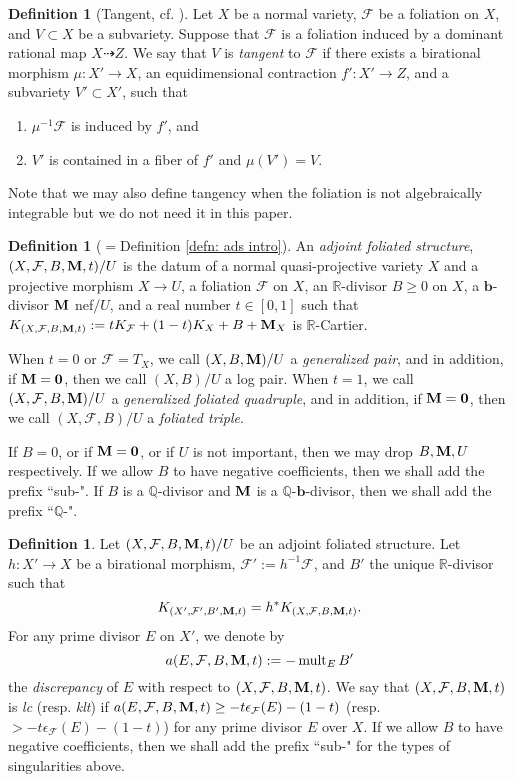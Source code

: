 \documentclass[12pt]{amsart}
\numberwithin{equation}{section}
\newcommand{\bb}{\bm{b}}
\newcommand{\Mm}{{\bf{M}}}
\newcommand{\Qq}{\mathbb{Q}}
\newcommand{\Rr}{\mathbb{R}}
\newcommand{\mult}{\operatorname{mult}}
\newcommand{\Ff}{\mathcal{F}}
\theoremstyle{definition}
\newtheorem{defn}[thm]{Definition}
\theoremstyle{definition}
\theoremstyle{definition}
\begin{document}
\begin{defn}[Tangent, {cf. \cite[Section 3.4]{ACSS21}}]\label{defn: tangent to foliation}
 Let $X$ be a normal variety, $\Ff$ be  a foliation on $X$, and $V\subset X$ be a subvariety. 
 Suppose that $\Ff$ is a foliation induced by a dominant rational map $X\dashrightarrow Z$. 
 We say that $V$ is \emph{tangent} to $\Ff$ if there exists a birational morphism $\mu: X'\rightarrow X$, an equidimensional contraction $f': X'\rightarrow Z$, and a subvariety $V'\subset X'$, such that
    \begin{enumerate}
    \item $\mu^{-1}\Ff$ is induced by $f'$, and
        \item $V'$ is contained in a fiber of $f'$ and $\mu(V')=V$.
    \end{enumerate}
Note that we may also define tangency when the foliation is not algebraically integrable but we do not need it in this paper.
\end{defn}

\begin{defn}[$=$Definition \ref{defn: ads intro}]\label{defn: ads}
An \emph{adjoint foliated structure}, $(X,\Ff,B,\Mm,t)/U$ is the datum of a normal quasi-projective variety $X$ and a projective morphism $X\rightarrow U$, a foliation $\Ff$ on $X$, an $\Rr$-divisor $B\geq 0$ on $X$, a $\bb$-divisor $\Mm$ nef$/U$, and a real number $t\in [0,1]$ such that $K_{(X,\Ff,B,\Mm,t)}:=tK_{\Ff}+(1-t)K_X+B+\Mm_X$ is $\Rr$-Cartier. 

When $t=0$ or $\Ff=T_X$, we call $(X,B,\Mm)/U$ a \emph{generalized pair}, and in addition, if $\Mm=\bm{0}$, then we call $(X,B)/U$ a log pair. 
When $t=1$, we call $(X,\Ff,B,\Mm)/U$ a \emph{generalized foliated quadruple}, and in addition, if $\Mm=\bm{0}$, then we call $(X,\Ff,B)/U$ a \emph{foliated triple}.

If $B=0$, or if $\Mm=\bm{0}$, or if $U$ is not important, then we may drop $B,\Mm,U$ respectively. If we allow $B$ to have negative coefficients, then we shall add the prefix ``sub-". If $B$ is a $\Qq$-divisor and $\Mm$ is a $\Qq$-$\bb$-divisor, then we shall add the prefix ``$\Qq$-".
\end{defn}

\begin{defn}\label{defn: sing of afs}
Let $(X,\Ff,B,\Mm,t)/U$ be an adjoint foliated structure. Let $h: X'\rightarrow X$ be a birational morphism, $\Ff':=h^{-1}\Ff$, and $B'$ the unique $\Rr$-divisor such that
$$K_{(X',\Ff',B',\Mm,t)}=h^\ast K_{(X,\Ff,B,\Mm,t)}.$$
 For any prime divisor $E$ on $X'$, we denote by
$$a(E,\Ff,B,\Mm,t):=-\mult_{E}B'$$
the \emph{discrepancy} of $E$ with respect to $(X,\Ff,B,\Mm,t)$. We say that $(X,\Ff,B,\Mm,t)$ is \emph{lc} (resp. \emph{klt}) if $a(E,\Ff,B,\Mm,t)\geq -t\epsilon_{\Ff}(E)-(1-t)$ (resp. $>-t\epsilon_{\Ff}(E)-(1-t)$) for any prime divisor $E$ over $X$. If we allow $B$ to have negative coefficients, then we shall add the prefix ``sub-" for the types of singularities above.
\end{defn}
\end{document}
